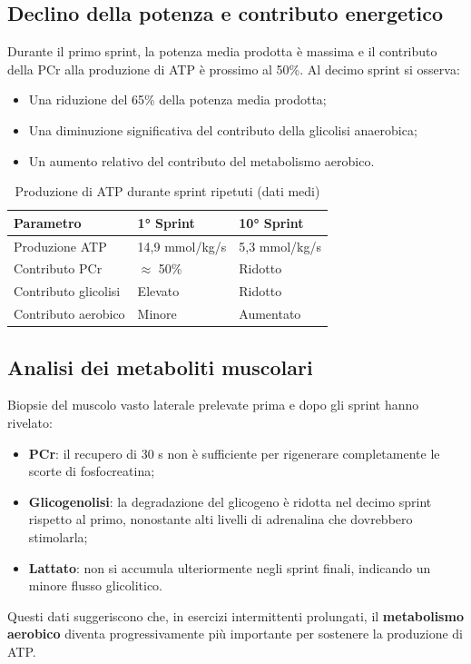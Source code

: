 \documentclass[12pt,a4paper]{report}
\begin{document}
\subsection{Declino della potenza e contributo energetico}
Durante il primo sprint, la potenza media prodotta è massima e il contributo della PCr alla produzione di ATP è prossimo al 50\%. Al decimo sprint si osserva:
\begin{itemize}
\item Una riduzione del 65\% della potenza media prodotta;
\item Una diminuzione significativa del contributo della glicolisi anaerobica;
\item Un aumento relativo del contributo del metabolismo aerobico.
\end{itemize}
\begin{table}[htbp]
\centering
\caption{Produzione di ATP durante sprint ripetuti (dati medi)}
\label{tab:sprint-atp}
\renewcommand{\arraystretch}{1.2}
\begin{tabular}{@{} p{} p{} p{} @{}}
\toprule
\textbf{Parametro} & \textbf{1° Sprint} & \textbf{10° Sprint} \\
\midrule
Produzione ATP & 14,9 mmol/kg/s & 5,3 mmol/kg/s \\
Contributo PCr & $\approx$ 50\% & Ridotto \\
Contributo glicolisi & Elevato & Ridotto \\
Contributo aerobico & Minore & Aumentato \\
\bottomrule
\end{tabular}
\end{table}
\subsection{Analisi dei metaboliti muscolari}
Biopsie del muscolo vasto laterale prelevate prima e dopo gli sprint hanno rivelato:
\begin{itemize}
\item \textbf{PCr}: il recupero di 30 s non è sufficiente per rigenerare completamente le scorte di fosfocreatina;
\item \textbf{Glicogenolisi}: la degradazione del glicogeno è ridotta nel decimo sprint rispetto al primo, nonostante alti livelli di adrenalina che dovrebbero stimolarla;
\item \textbf{Lattato}: non si accumula ulteriormente negli sprint finali, indicando un minore flusso glicolitico.
\end{itemize}
Questi dati suggeriscono che, in esercizi intermittenti prolungati, il \textbf{metabolismo aerobico} diventa progressivamente più importante per sostenere la produzione di ATP.
\end{document}
